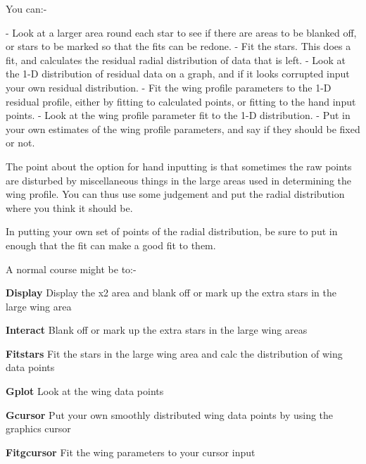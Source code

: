 \begin{small}
{{ You can:-

   -  Look at a larger area round each star to see if there are areas
      to be blanked off, or stars to be marked so that the fits can
      be redone.
   -  Fit the stars. This does a fit, and calculates the residual
      radial distribution of data that is left.
   -  Look at the 1-D distribution of residual data on a graph,
      and if it looks corrupted input your own residual distribution.
   -  Fit the wing profile parameters to the 1-D residual profile,
      either by fitting to calculated points, or fitting to the
      hand input points.
   -  Look at the wing profile parameter fit to the 1-D distribution.
   -  Put in your own estimates of the wing profile parameters, and
      say if they should be fixed or not.

 The point about the option for hand inputting is that sometimes
 the raw points are disturbed by miscellaneous things in the large
 areas used in determining the wing profile. You can thus use
 some judgement and put the radial distribution where you think it
 should be.

 In putting your own set of points of the radial distribution, be sure
 to put in enough that the fit can make a good fit to them.

   A normal course might be to:-

\begin{list}{{-}}{}

\item {\bf Display \hspace*{2ex}} Display the x2 area and blank
                                  off or mark up the extra stars
                                  in the large wing area
\item {\bf Interact \hspace*{2ex}}   Blank off or mark up the extra
                                  stars in the large wing areas
\item {\bf Fit{\undersc}stars \hspace*{2ex}}    Fit the stars in
                                  the large wing area and calc
                                  the distribution of wing data points
\item {\bf Gplot \hspace*{2ex}}   Look at the wing data points
\item {\bf Gcursor \hspace*{2ex}} Put your own smoothly distributed
                                  wing data points by using the
                                  graphics cursor
\item {\bf Fit{\undersc}gcursor \hspace*{2ex}}    Fit the wing
                                  parameters to your cursor input
\end{list}

}}
\end{small}
